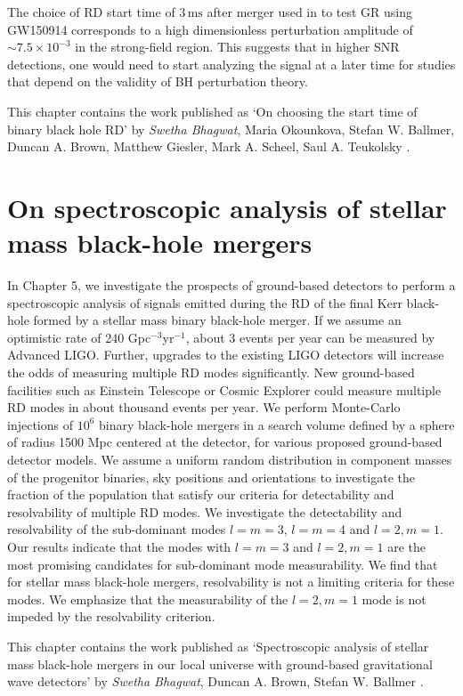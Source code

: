 The choice of RD start time of $3\,\mathrm{ms}$ after merger used in \cite{TheLIGOScientific:2016src} to test GR using GW150914 corresponds to a high dimensionless
perturbation amplitude of $ \sim 7.5 \times 10^{-3}$ in the strong-field
region. This suggests that in higher SNR detections, one would need
to start analyzing the signal at a later time for studies that depend on the
validity of BH perturbation theory.

This chapter contains the work published as `On choosing the start time of binary black hole RD' by 
\textit{Swetha Bhagwat}, Maria Okounkova, Stefan W. Ballmer, Duncan A. Brown, Matthew Giesler, Mark A. Scheel, Saul A. Teukolsky \cite{MeMasha}.



\section{On spectroscopic analysis of stellar mass black-hole mergers}
In Chapter 5, we investigate the prospects of ground-based detectors to perform a spectroscopic analysis of signals emitted during the RD of the final Kerr black-hole formed by a stellar mass binary black-hole merger. If we assume an optimistic rate of 240 Gpc$^{-3}$yr$^{-1}$, about 3 events per year can be measured by Advanced LIGO. Further, upgrades to the existing LIGO detectors will increase the odds of measuring multiple RD modes significantly. New ground-based facilities such as Einstein Telescope or Cosmic Explorer could measure multiple RD modes in about thousand events per year. We perform Monte-Carlo injections of $10^{6}$ binary black-hole mergers in a search volume defined by a sphere of radius 1500 Mpc centered at the detector, for various proposed ground-based detector models. We assume a uniform random distribution in component masses of the progenitor binaries, sky positions and orientations to investigate the fraction of the population that satisfy our criteria for detectability and resolvability of multiple RD modes. We investigate the detectability and resolvability of the sub-dominant modes $l=m=3$, $l=m=4$ and $l=2, m=1$. Our results indicate that the modes with $l=m=3$ and $l=2, m=1$ are the most promising candidates for sub-dominant mode measurability. We find that for stellar mass black-hole mergers, resolvability is not a limiting criteria for these modes. We emphasize that the measurability of the $l=2, m=1$ mode is not impeded by the resolvability criterion.

This chapter contains the work published as `Spectroscopic analysis of stellar mass black-hole mergers in our local universe with ground-based gravitational wave detectors' by \textit{Swetha Bhagwat}, Duncan A. Brown, Stefan W. Ballmer \cite{MeSpec}.



